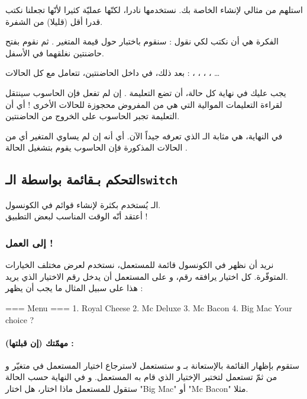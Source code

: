 استلهم من مثالي لإنشاء
الخاصة بك. نستخدمها نادرا، لكنّها عمليّة كثيرا لأنّها تجعلنا نكتب قدرا أقل (قليلا) من الشفرة.

الفكرة هي أن نكتب 
 لكي نقول : سنقوم باختبار حول قيمة المتغير
.
ثم نقوم بفتح حاضنتين نغلقهما في الأسفل.

بعد ذلك، في داخل الحاضنتين، تتعامل مع كل الحالات :
، ، ، ، \dots

يجب عليك في نهاية كل حالة، أن تضع التعليمة 
.
إن لم تفعل فإن الحاسوب سينتقل لقراءة التعليمات الموالية التي هي  من المفروض محجوزة للحالات الأخرى ! أي أن التعليمة 
تجبر الحاسوب على الخروج من الحاضنتين.

في النهاية،
هي مثابة الـ
الذي تعرفه جيداً الآن. أي أنه إن لم يساوي المتغير أي من الحالات المذكورة فإن الحاسوب يقوم بتشغيل الحالة
.

\subsection{التحكم بـقائمة بواسطة الـ\texttt{switch}}

الـ
يُستخدم بكثرة لإنشاء قوائم في الكونسول.\\
أعتقد أنّه الوقت المناسب لبعض التطبيق !

\subsubsection{إلى العمل !}

نريد أن نظهر في الكونسول قائمة للمستعمل، نستخدم
لعرض مختلف الخيارات المتوفّرة. كل اختيار يرافقه رقم، و على المستعمل أن يدخل رقم الاختيار الذي يريد.\\
هذا على سبيل المثال ما يجب أن يظهر :

\begin{Console}
=== Menu ===
1. Royal Cheese
2. Mc Deluxe
3. Mc Bacon
4. Big Mac
Your choice ?
\end{Console}

\paragraph{مهمّتك (إن قبلتها) :}
ستقوم بإظهار القائمة بالإستعانة بـ 
و ستستعمل 
لاسترجاع اختيار المستعمل  في متغيّر
و من ثمّ تستعمل
لتختبر الإختيار الذي قام به المستعمل. و في النهاية حسب الحالة ستقول للمستعمل ماذا اختار، هل اختار
"\textenglish{Big Mac}"
أو
"\textenglish{Mc Bacon}"
مثلا.

